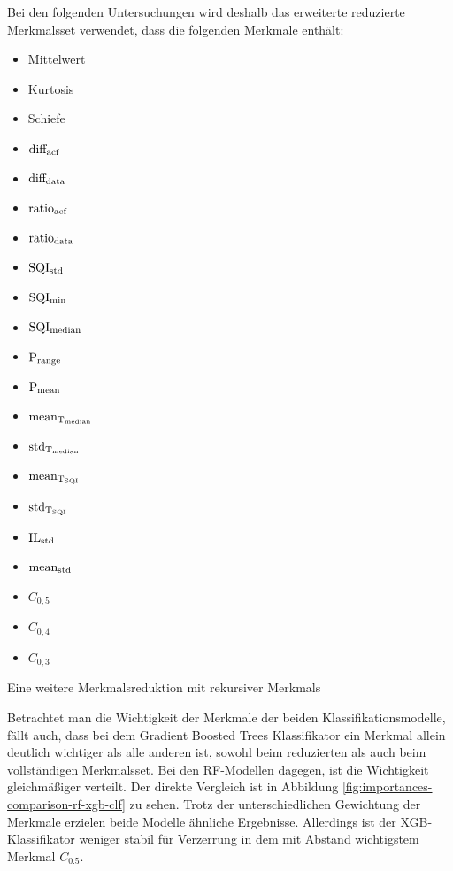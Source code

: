 Bei den folgenden Untersuchungen wird deshalb das erweiterte reduzierte Merkmalsset verwendet, dass die folgenden Merkmale enthält:
\begin{multicols}{2}
\begin{itemize}
	\item Mittelwert
	\item Kurtosis
	\item Schiefe
	\item $\text{diff}\textsubscript{acf}$
	\item $\text{diff}\textsubscript{data}$
	\item $\text{ratio}\textsubscript{acf}$
	\item $\text{ratio}\textsubscript{data}$
	\item $\text{SQI}\textsubscript{std}$
	\item $\text{SQI}\textsubscript{min}$
	\item $\text{SQI}\textsubscript{median}$
	\item $\text{P}\textsubscript{range}$
	\item $\text{P}\textsubscript{mean}$
	\item $\text{mean}\textsubscript{T\textsubscript{median}}$
	\item $\text{std}\textsubscript{T\textsubscript{median}}$
	\item $\text{mean}\textsubscript{T\textsubscript{SQI}}$
	\item $\text{std}\textsubscript{T\textsubscript{SQI}}$
	\item $\text{IL}\textsubscript{std}$
	\item $\text{mean}\textsubscript{std}$
	\item $C_{0,5}$
	\item $C_{0,4}$
	\item $C_{0,3}$
\end{itemize}
\end{multicols}

Eine weitere Merkmalsreduktion mit rekursiver Merkmals

	
Betrachtet man die Wichtigkeit der Merkmale der beiden Klassifikationsmodelle, fällt auch, dass bei dem Gradient Boosted Trees Klassifikator ein Merkmal allein deutlich wichtiger als alle anderen ist, sowohl beim reduzierten als auch beim vollständigen Merkmalsset. Bei den \ac{RF}-Modellen dagegen, ist die Wichtigkeit gleichmäßiger verteilt. Der direkte Vergleich ist in Abbildung \ref{fig:importances-comparison-rf-xgb-clf} zu sehen. Trotz der unterschiedlichen Gewichtung der Merkmale erzielen beide Modelle ähnliche Ergebnisse. Allerdings ist der \ac{XGB}-Klassifikator weniger stabil für Verzerrung in dem mit Abstand wichtigstem Merkmal $C_{0.5}$.

